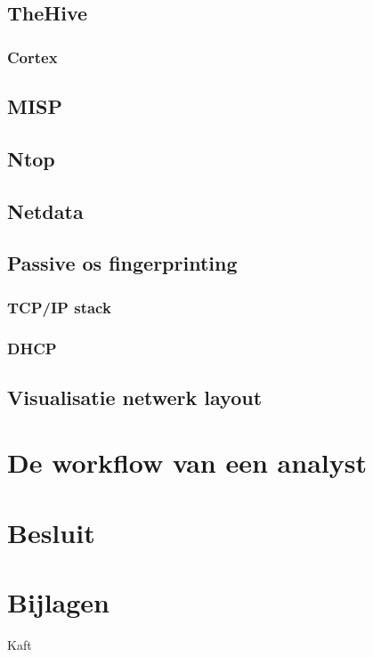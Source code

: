\documentclass[a4paper, 12pt]{report}
\begin{document}
\section{TheHive}
\subsection{Cortex}
\section{MISP}
\section{Ntop}
\section{Netdata}

\section{Passive os fingerprinting}
\subsection{TCP/IP stack}
\subsection{DHCP}

\section{Visualisatie netwerk layout}

\chapter{De workflow van een analyst}


\chapter*{Besluit}
\blindtext

\chapter*{Bijlagen}
\blindtext

\printbibliography
{}

\newpage
\thispagestyle{empty}
\mbox{}

\newpage
Kaft
\end{document}
